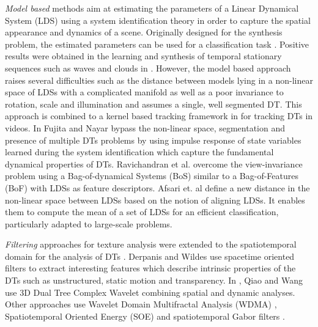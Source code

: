 \documentclass[a4paper,11pt]{article}
\begin{document}
\textit{Model based} methods \cite{doretto2003dynamic,saisan2001dynamic,ravichandran2013categorizing,chaudhry2013dynamic,afsari2012group,fujita2003recognition}
aim at estimating the parameters of a Linear Dynamical System (LDS) using a system identification theory in order to capture the spatial appearance and dynamics of a scene.
Originally designed for the synthesis problem, the estimated parameters can be used for a classification task \cite{doretto2003dynamic}.
Positive results were obtained in the learning and synthesis of temporal stationary sequences such as waves and clouds in \cite{doretto2003dynamic}.
However, the model based approach raises several difficulties such as the distance between models lying in a non-linear space of LDSs with a complicated manifold as well as a poor
invariance to rotation, scale and illumination and assumes a single, well segmented DT.
This approach is combined to a kernel based tracking framework in \cite{chaudhry2013dynamic} for tracking DTs in videos.
In \cite{fujita2003recognition} Fujita and Nayar bypass the non-linear space, segmentation and presence of multiple DTs problems by using impulse response of state variables learned during the system identification which capture the fundamental dynamical properties of DTs.
Ravichandran et al. \cite{ravichandran2013categorizing} overcome the view-invariance problem using a Bag-of-dynamical Systems (BoS) similar to a Bag-of-Features (BoF) with LDSs as feature descriptors.
Afsari et. al \cite{afsari2012group} define a new distance in the non-linear space between LDSs based on the notion of aligning LDSs.
It enables them to compute the mean of a set of LDSs for an efficient classification, particularly adapted to large-scale problems.

\textit{Filtering} approaches for texture analysis were extended to the spatiotemporal domain for the analysis of DTs \cite{derpanis2010dynamic,yu2011dynamic,gonccalves2012spatiotemporal,ji2013wavelet,feichtenhofer2014bags}. 
Derpanis and Wildes \cite{derpanis2010dynamic} use spacetime oriented filters to extract interesting features which describe intrinsic properties of the DTs
such as unstructured, static motion and transparency.
In \cite{yu2011dynamic}, Qiao and Wang use 3D Dual Tree Complex Wavelet combining spatial and dynamic analyses.
Other approaches use Wavelet Domain Multifractal Analysis (WDMA) \cite{ji2013wavelet}, Spatiotemporal Oriented Energy (SOE) \cite{feichtenhofer2014bags} and spatiotemporal Gabor filters \cite{gonccalves2012spatiotemporal}.
\end{document}
